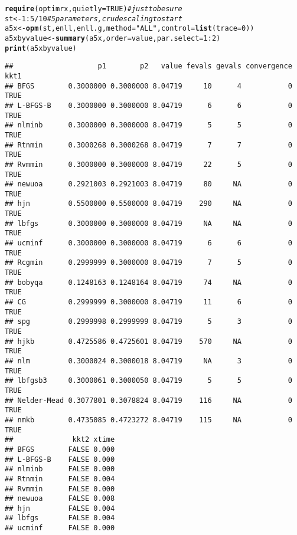 \documentclass[11pt]{article}\usepackage[]{graphicx}\usepackage[]{color}
\makeatletter
\newcommand{\hlnum}[1]{\textcolor[rgb]{0.686,0.059,0.569}{#1}}%
\newcommand{\hlstr}[1]{\textcolor[rgb]{0.192,0.494,0.8}{#1}}%
\newcommand{\hlcom}[1]{\textcolor[rgb]{0.678,0.584,0.686}{\textit{#1}}}%
\newcommand{\hlopt}[1]{\textcolor[rgb]{0,0,0}{#1}}%
\newcommand{\hlstd}[1]{\textcolor[rgb]{0.345,0.345,0.345}{#1}}%
\newcommand{\hlkwb}[1]{\textcolor[rgb]{0.69,0.353,0.396}{#1}}%
\newcommand{\hlkwc}[1]{\textcolor[rgb]{0.333,0.667,0.333}{#1}}%
\newcommand{\hlkwd}[1]{\textcolor[rgb]{0.737,0.353,0.396}{\textbf{#1}}}%
\newenvironment{kframe}{%
 \def\at@end@of@kframe{}%
 \ifinner\ifhmode%
  \def\at@end@of@kframe{\end{minipage}}%
  \begin{minipage}{\columnwidth}%
 \fi\fi%
 \def\FrameCommand##1{\hskip\@totalleftmargin \hskip-\fboxsep
 \colorbox{shadecolor}{##1}\hskip-\fboxsep
     \hskip-\linewidth \hskip-\@totalleftmargin \hskip\columnwidth}%
 \MakeFramed {\advance\hsize-\width
   \@totalleftmargin\z@ \linewidth\hsize
   \@setminipage}}%
 {\par\unskip\endMakeFramed%
 \at@end@of@kframe}
\newenvironment{knitrout}{}{} %
\makeatother
\begin{document}
\begin{knitrout}\scriptsize
{}\color{fgcolor}\begin{kframe}
\begin{alltt}
\hlkwd{require}\hlstd{(optimrx,} \hlkwc{quietly}\hlstd{=}\hlnum{TRUE}\hlstd{)} \hlcom{# just to be sure}
\hlstd{st}\hlkwb{<-}\hlnum{1}\hlopt{:}\hlnum{5}\hlopt{/}\hlnum{10} \hlcom{# 5 parameters, crude scaling to start}
\hlstd{a5x}\hlkwb{<-}\hlkwd{opm}\hlstd{(st, enll, enll.g,} \hlkwc{method}\hlstd{=}\hlstr{"ALL"}\hlstd{,} \hlkwc{control}\hlstd{=}\hlkwd{list}\hlstd{(}\hlkwc{trace}\hlstd{=}\hlnum{0}\hlstd{))}
\hlstd{a5xbyvalue}\hlkwb{<-}\hlkwd{summary}\hlstd{(a5x,} \hlkwc{order}\hlstd{=value,} \hlkwc{par.select}\hlstd{=}\hlnum{1}\hlopt{:}\hlnum{2}\hlstd{)}
\hlkwd{print}\hlstd{(a5xbyvalue)}
\end{alltt}
\begin{verbatim}
##                    p1        p2   value fevals gevals convergence kkt1
## BFGS        0.3000000 0.3000000 8.04719     10      4           0 TRUE
## L-BFGS-B    0.3000000 0.3000000 8.04719      6      6           0 TRUE
## nlminb      0.3000000 0.3000000 8.04719      5      5           0 TRUE
## Rtnmin      0.3000268 0.3000268 8.04719      7      7           0 TRUE
## Rvmmin      0.3000000 0.3000000 8.04719     22      5           0 TRUE
## newuoa      0.2921003 0.2921003 8.04719     80     NA           0 TRUE
## hjn         0.5500000 0.5500000 8.04719    290     NA           0 TRUE
## lbfgs       0.3000000 0.3000000 8.04719     NA     NA           0 TRUE
## ucminf      0.3000000 0.3000000 8.04719      6      6           0 TRUE
## Rcgmin      0.2999999 0.3000000 8.04719      7      5           0 TRUE
## bobyqa      0.1248163 0.1248164 8.04719     74     NA           0 TRUE
## CG          0.2999999 0.3000000 8.04719     11      6           0 TRUE
## spg         0.2999998 0.2999999 8.04719      5      3           0 TRUE
## hjkb        0.4725586 0.4725601 8.04719    570     NA           0 TRUE
## nlm         0.3000024 0.3000018 8.04719     NA      3           0 TRUE
## lbfgsb3     0.3000061 0.3000050 8.04719      5      5           0 TRUE
## Nelder-Mead 0.3077801 0.3078824 8.04719    116     NA           0 TRUE
## nmkb        0.4735085 0.4723272 8.04719    115     NA           0 TRUE
##              kkt2 xtime
## BFGS        FALSE 0.000
## L-BFGS-B    FALSE 0.000
## nlminb      FALSE 0.000
## Rtnmin      FALSE 0.004
## Rvmmin      FALSE 0.000
## newuoa      FALSE 0.008
## hjn         FALSE 0.004
## lbfgs       FALSE 0.004
## ucminf      FALSE 0.000

\end{verbatim}
\end{kframe}
\end{knitrout}
\end{document}
